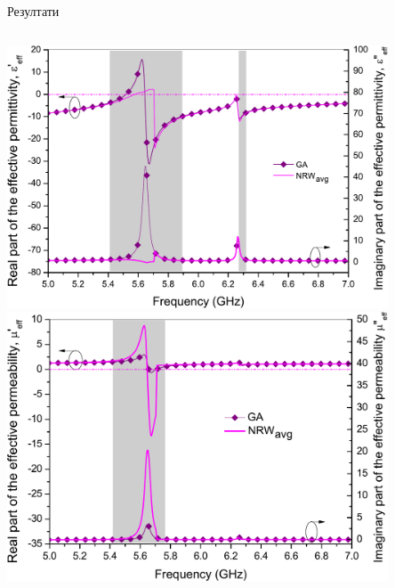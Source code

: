 \documentclass{beamer}
\begin{document}
\begin{frame}[t]{Резултати}
\begin{columns}[c]
\includegraphics[width=0.85\textwidth]{slike/14c.pdf}
\includegraphics[width=0.85\textwidth]{slike/14e.pdf}

\end{columns}
\end{frame}
\end{document}
